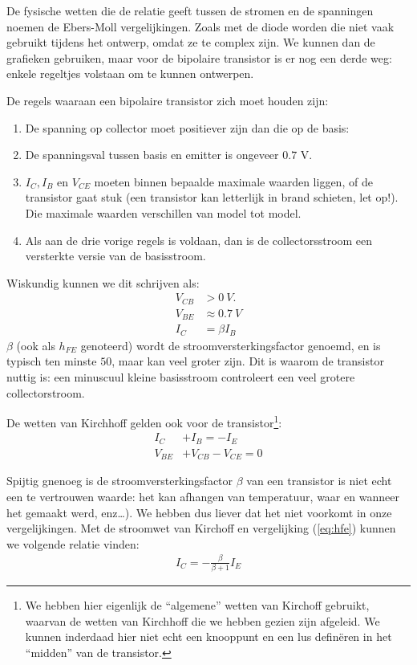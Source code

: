 \documentclass{article}
\begin{document}
				De fysische wetten die de relatie geeft tussen de stromen en de spanningen noemen de Ebers-Moll vergelijkingen. Zoals met de diode worden die niet vaak gebruikt tijdens het ontwerp, omdat ze te complex zijn. We kunnen dan  de grafieken gebruiken, maar voor de bipolaire transistor is er nog een derde weg: enkele regeltjes volstaan om te kunnen ontwerpen. 

				De regels waaraan een bipolaire transistor zich moet houden zijn:
				\begin{enumerate}
					\item De spanning op collector moet positiever zijn dan die op de basis: 
					\item De spanningsval tussen basis en emitter is ongeveer $0.7$ V.
					\item $I_C, I_B$ en $V_{CE} $ moeten binnen bepaalde maximale waarden liggen, of de transistor gaat stuk (een transistor kan letterlijk in brand schieten, let op!). Die maximale waarden verschillen van model tot model.
					\item Als aan de drie vorige regels is voldaan, dan is de collectorsstroom een versterkte versie van de basisstroom.
				\end{enumerate}
				Wiskundig kunnen we dit schrijven als:
					\begin{align}
					    V_{CB} &> 0~V. \\
						V_{BE} &\approx 0.7~V \\
					    I_C &= \beta I_B
					    \label{eq:hfe}
					\end{align}
					$\beta$ (ook als $h_{FE}$ genoteerd) wordt de stroomversterkingsfactor genoemd, en is typisch ten minste $50$, maar kan veel groter zijn. Dit is waarom de transistor nuttig is: een minuscuul kleine basisstroom controleert een veel grotere collectorstroom.


				De wetten van Kirchhoff gelden ook voor de transistor\footnote{We hebben hier eigenlijk de ``algemene'' wetten van Kirchoff gebruikt, waarvan de wetten van Kirchhoff die we hebben gezien zijn afgeleid. We kunnen inderdaad hier niet echt een knooppunt en een lus defin\"eren in het ``midden'' van de transistor.}:
				\begin{align}
				    I_C		&+ I_B = -I_E \\
				    V_{BE}  &+ V_{CB} - V_{CE} = 0
				\end{align}

				Spijtig gnenoeg is de stroomversterkingsfactor $\beta$ van een transistor is niet echt een te vertrouwen waarde: het kan afhangen van temperatuur, waar en wanneer het gemaakt werd, enz\ldots). We hebben dus liever dat het niet voorkomt in onze vergelijkingen. Met de stroomwet van Kirchoff en vergelijking (\ref{eq:hfe}) kunnen we volgende relatie vinden:
				\begin{align}
				    I_C = -\frac{\beta}{\beta+1}I_E
				\end{align}
\end{document}
